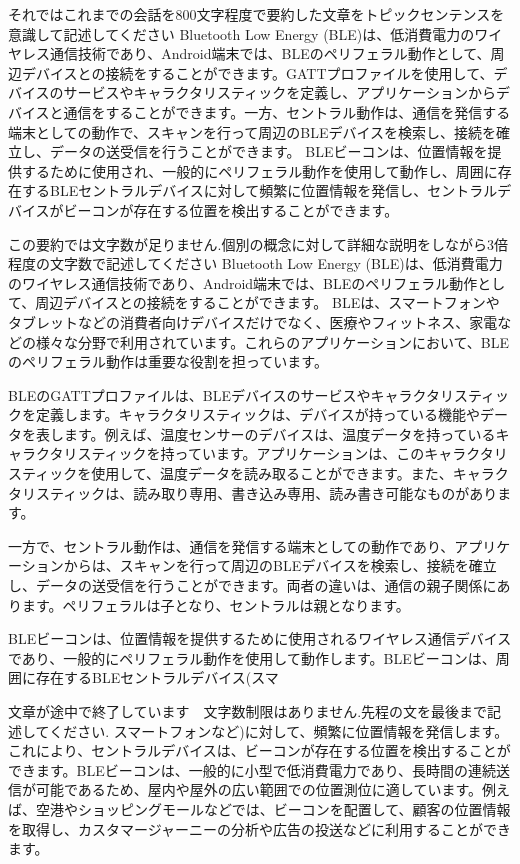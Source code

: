 それではこれまでの会話を800文字程度で要約した文章をトピックセンテンスを意識して記述してください
Bluetooth Low Energy (BLE)は、低消費電力のワイヤレス通信技術であり、Android端末では、BLEのペリフェラル動作として、周辺デバイスとの接続をすることができます。GATTプロファイルを使用して、デバイスのサービスやキャラクタリスティックを定義し、アプリケーションからデバイスと通信をすることができます。一方、セントラル動作は、通信を発信する端末としての動作で、スキャンを行って周辺のBLEデバイスを検索し、接続を確立し、データの送受信を行うことができます。 BLEビーコンは、位置情報を提供するために使用され、一般的にペリフェラル動作を使用して動作し、周囲に存在するBLEセントラルデバイスに対して頻繁に位置情報を発信し、セントラルデバイスがビーコンが存在する位置を検出することができます。





この要約では文字数が足りません.個別の概念に対して詳細な説明をしながら3倍程度の文字数で記述してください
Bluetooth Low Energy (BLE)は、低消費電力のワイヤレス通信技術であり、Android端末では、BLEのペリフェラル動作として、周辺デバイスとの接続をすることができます。 BLEは、スマートフォンやタブレットなどの消費者向けデバイスだけでなく、医療やフィットネス、家電などの様々な分野で利用されています。これらのアプリケーションにおいて、BLEのペリフェラル動作は重要な役割を担っています。

BLEのGATTプロファイルは、BLEデバイスのサービスやキャラクタリスティックを定義します。キャラクタリスティックは、デバイスが持っている機能やデータを表します。例えば、温度センサーのデバイスは、温度データを持っているキャラクタリスティックを持っています。アプリケーションは、このキャラクタリスティックを使用して、温度データを読み取ることができます。また、キャラクタリスティックは、読み取り専用、書き込み専用、読み書き可能なものがあります。

一方で、セントラル動作は、通信を発信する端末としての動作であり、アプリケーションからは、スキャンを行って周辺のBLEデバイスを検索し、接続を確立し、データの送受信を行うことができます。両者の違いは、通信の親子関係にあります。ペリフェラルは子となり、セントラルは親となります。

BLEビーコンは、位置情報を提供するために使用されるワイヤレス通信デバイスであり、一般的にペリフェラル動作を使用して動作します。BLEビーコンは、周囲に存在するBLEセントラルデバイス(スマ





文章が途中で終了しています　文字数制限はありません.先程の文を最後まで記述してください.
スマートフォンなど)に対して、頻繁に位置情報を発信します。これにより、セントラルデバイスは、ビーコンが存在する位置を検出することができます。BLEビーコンは、一般的に小型で低消費電力であり、長時間の連続送信が可能であるため、屋内や屋外の広い範囲での位置測位に適しています。例えば、空港やショッピングモールなどでは、ビーコンを配置して、顧客の位置情報を取得し、カスタマージャーニーの分析や広告の投送などに利用することができます。

